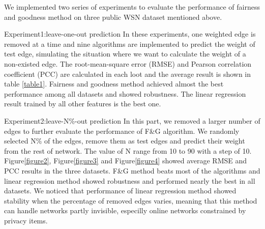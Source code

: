 
We implemented two series of experiments to evaluate the 
performance of fairness and goodness method on three public 
WSN dataset mentioned above. 

Experiment1:leave-one-out prediction
In these experiments, one weighted edge is removed at a time 
and nine algorithms are implemented to predict the weight of 
test edge, simulating the situation where we want to calculate 
the weight of a non-existed edge. The root-mean-square error 
(RMSE) and Pearson correlation coefficient (PCC) are calculated 
in each loot and the average result is shown in table \ref{table1}. 
Fairness and goodness method achieved almost the best 
performance among all datasets and showed robustness. 
The linear regression result trained by all other features 
is the best one. 

Experiment2:leave-N\%-out prediction
In this part, we removed a larger number of edges to further 
evaluate the performance of F\&G algorithm. We randomly selected 
N\% of the edges, remove them as test edges and predict their 
weight from the rest of network. The value of N range from 10 
to 90 with a step of 10. Figure\ref{figure2}, Figure\ref{figure3} and 
Figure\ref{figure4} showed average RMSE and PCC results in 
the three datasets. F\&G method beats most of the algorithms 
and linear regression method showed robustness and performed 
nearly the best in all datasets. We noticed that performance of
 linear regression method showed stability when the percentage 
 of removed edges varies, meaning that this method can handle 
 networks partly invisible, especilly online networks 
 constrained by privacy items. 


